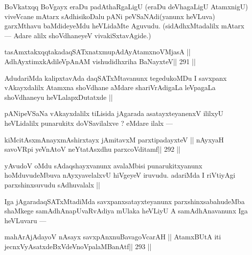\begin{artha}
BoVkatxqq BoVgayx eraDu padAthaRgaLigU (eraDu deVhagaLigU AtamxnigU) viveVcane mAtarx sAdhisikoDalu pANi peVSaNAdi(yanunx heVLuva) garxMthavu baMdideyeMdu heVLidaMte Aguvudu. (sidAdhxMtadalilx mAtarx --- Adare alilx shoVdhaneyeV vivakiSxtavAgide.)
\end{artha}

\begin{shl}
\footnotemark[3]tasAmxtakxqqtakadaqSATxnatxmupAdAyA\s\s tamxnoV\s MjasA ||
AdhAyxtimxkAdileVpAnAM vishudidhxriha BaNayxteV\hfill || 291 ||
\end{shl}

\begin{artha}
AdudariMda kalipxtavAda daqSATxMtavanunx tegedukoMDu I savxpanx vAkayxdalilx Atamxna shoVdhane aMdare shariVrAdigaLa leVpagaLa shoVdhaneyu heVLalapxDutatxde ||
\end{artha}

\begin{artha}
pANipeVSaNa vAkayxdalilx tiLisida jAgarada asatayxteyanenxV ililxyU heVLidalilx punarukitx doVSavilalxve ? eMdare ilalx ---
\end{artha}

\begin{shl}
kiMcitAsxmAnayxmAshirxtayx jAmitavxM parxtipadayxteV ||
nAyxyaH savoVR\s pi yeVnAtoV neYtatAsxdhu parxcoVditamf\hfill || 292 ||
\end{shl}

\begin{artha}
yAvudoV oMdu sAdaqshayxvanunx avalaMbisi punarukitxyanunx 
hoMduvudeMbuva nAyxyavelalxvU hiVgeyeV iruvudu. adariMda I riVtiyAgi parxshinxsuvudu sAdhuvalalx ||
\end{artha}

\begin{artha}
Iga jAgaradaqSATxMtadiMda savxpanxsatayxteyanunx parxshinxsabahudeMba shaMkege samAdhAnapUvaRvAdiya mUlaka heVLiyU A samAdhAnavanunx Iga heVLuvaru ---
\end{artha}

\begin{shl}
mahArAjAdayoV nAsayx savxpAnxnuBavagoVcarAH ||
AtamxBUtA iti jecnxVyAsatxdeBxVdeVnoVpalaMBanAtf\hfill || 293 ||
\end{shl}

